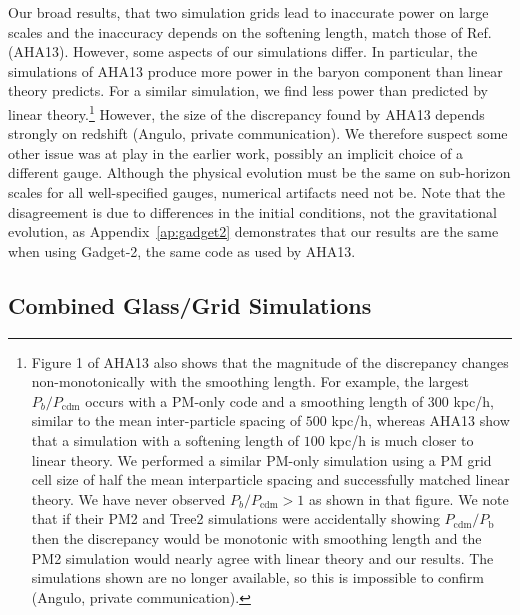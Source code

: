 \documentclass[a4paper,11pt]{article}
\begin{document}
Our broad results, that two simulation grids lead to inaccurate power on large scales and the inaccuracy depends on the softening length, match those of Ref.~\cite{Angulo:2013} (AHA13). However, some aspects of our simulations differ. In particular, the simulations of AHA13 produce more power in the baryon component than linear theory predicts. For a similar simulation, we find less power than predicted by linear theory.\footnote{Figure 1 of AHA13 also shows that the magnitude of the discrepancy changes non-monotonically with the smoothing length. For example, the largest $P_{b}/P_\mathrm{cdm}$ occurs with a PM-only code and a smoothing length of $300$ kpc/h, similar to the mean inter-particle spacing of $500$ kpc/h, whereas AHA13 show that a simulation with a softening length of $100$ kpc/h is much closer to linear theory. We performed a similar PM-only simulation using a PM grid cell size of half the mean interparticle spacing and successfully matched linear theory. We have never observed $P_{b}/P_\mathrm{cdm} > 1$ as shown in that figure. We note that if their PM2 and Tree2 simulations were accidentally showing $P_\mathrm{cdm}/P_\mathrm{b}$ then the discrepancy would be monotonic with smoothing length and the PM2 simulation would nearly agree with linear theory and our results. The simulations shown are no longer available, so this is impossible to confirm (Angulo, private communication).} However, the size of the discrepancy found by AHA13 depends strongly on redshift (Angulo, private communication). We therefore suspect some other issue was at play in the earlier work, possibly an implicit choice of a different gauge. Although the physical evolution must be the same on sub-horizon scales for all well-specified gauges, numerical artifacts need not be. Note that the disagreement is due to differences in the initial conditions, not the gravitational evolution, as Appendix~\ref{ap:gadget2} demonstrates that our results are the same when using Gadget-2, the same code as used by AHA13.

\subsection{Combined Glass/Grid Simulations}
\label{sec:halfglass}
\end{document}
